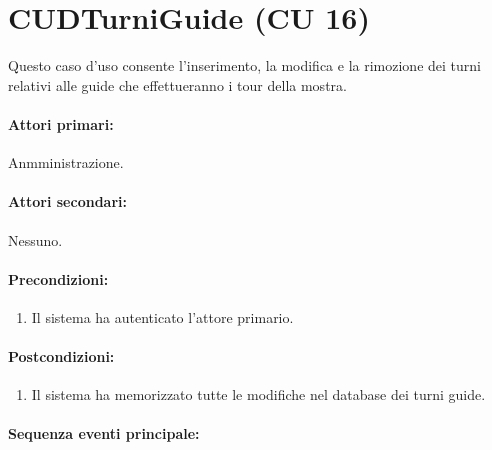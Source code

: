 \documentclass{article}
\begin{document}
\section*{CUDTurniGuide (CU 16)}
	
\indent\indent Questo caso d'uso consente l’inserimento, la modifica e la rimozione dei turni relativi alle guide che effettueranno i tour della mostra.
	
	\paragraph{Attori primari:}Anmministrazione.
	
	\paragraph{Attori secondari:}Nessuno.
	
	\paragraph{Precondizioni:}
		\begin{enumerate}	[itemsep=8pt,parsep=0pt]
			\item Il sistema ha autenticato l'attore primario.
		\end{enumerate}
	
	\paragraph{Postcondizioni:}
\begin{enumerate}	[itemsep=8pt,parsep=0pt]
\item Il sistema ha memorizzato tutte le modifiche nel database dei turni guide.
\end{enumerate}
	
	\paragraph{Sequenza eventi principale:}
\end{document}
